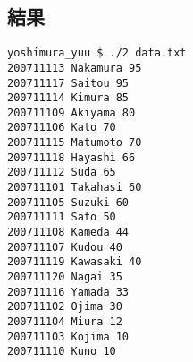 \documentclass[11pt,a4paper,a4j]{jsarticle}
\begin{document}
\subsection{結果}
\begin{shadebox}
\begin{verbatim}
yoshimura_yuu $ ./2 data.txt
200711113 Nakamura 95
200711117 Saitou 95
200711114 Kimura 85
200711109 Akiyama 80
200711106 Kato 70
200711115 Matumoto 70
200711118 Hayashi 66
200711112 Suda 65
200711101 Takahasi 60
200711105 Suzuki 60
200711111 Sato 50
200711108 Kameda 44
200711107 Kudou 40
200711119 Kawasaki 40
200711120 Nagai 35
200711116 Yamada 33
200711102 Ojima 30
200711104 Miura 12
200711103 Kojima 10
200711110 Kuno 10
\end{verbatim}
\end{shadebox}
\end{document}
